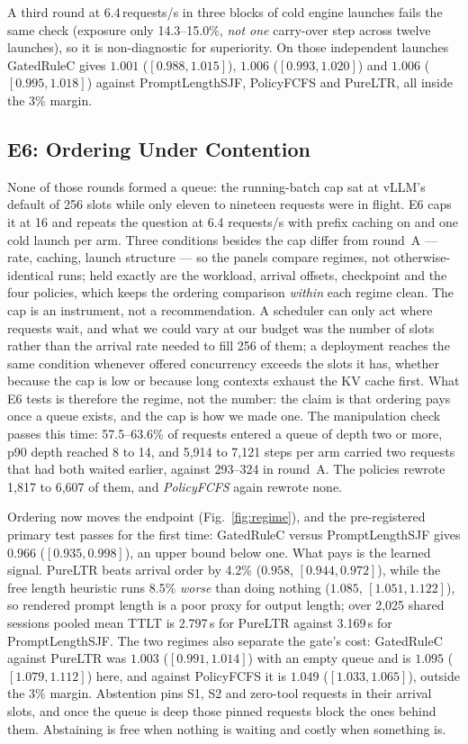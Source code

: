 A third round at 6.4\,requests/s in three blocks of cold engine launches
fails the same check (exposure only 14.3--15.0\%, \emph{not one} carry-over
step across twelve launches), so it is non-diagnostic for superiority. On
those independent launches GatedRuleC gives $1.001$ ($[0.988, 1.015]$),
$1.006$ ($[0.993, 1.020]$) and $1.006$ ($[0.995, 1.018]$) against
PromptLengthSJF, PolicyFCFS and PureLTR, all inside the 3\% margin.

\subsection{E6: Ordering Under Contention}
None of those rounds formed a queue: the running-batch cap sat at vLLM's
default of 256 slots while only eleven to nineteen requests were in flight.
E6 caps it at 16 and repeats the question at 6.4 requests/s with prefix
caching on and one cold launch per arm. Three conditions besides the cap
differ from round~A --- rate, caching, launch structure --- so the panels
compare regimes, not otherwise-identical runs; held exactly are the
workload, arrival offsets, checkpoint and the four policies, which keeps the
ordering comparison \emph{within} each regime clean. The cap
is an instrument, not a recommendation. A scheduler can only act where
requests wait, and what we could vary at our budget was the number of slots
rather than the arrival rate needed to fill 256 of them; a deployment
reaches the same condition whenever offered concurrency exceeds the slots
it has, whether because the cap is low or because long contexts exhaust the
KV cache first. What E6 tests is therefore the regime, not the number: the
claim is that ordering pays once a queue exists, and the cap is how we made
one. The
manipulation check passes this time: 57.5--63.6\% of requests entered a
queue of depth two or more, p90 depth reached 8 to 14, and 5{,}914 to
7{,}121 steps per arm carried two requests that had both waited earlier,
against 293--324 in round~A. The policies rewrote 1{,}817 to 6{,}607 of
them, and \emph{PolicyFCFS} again rewrote none.

Ordering now moves the endpoint (Fig.~\ref{fig:regime}), and the
pre-registered primary test passes for the first time: GatedRuleC versus PromptLengthSJF gives $0.966$
($[0.935, 0.998]$), an upper bound below one. What pays is the learned
signal. PureLTR beats arrival order by 4.2\% ($0.958$, $[0.944, 0.972]$),
while the free length heuristic runs 8.5\% \emph{worse} than doing nothing
($1.085$, $[1.051, 1.122]$), so rendered prompt length is a poor proxy for
output length; over 2{,}025 shared sessions pooled mean TTLT is 2.797\,s for
PureLTR against 3.169\,s for PromptLengthSJF. The two regimes also separate
the gate's cost:
GatedRuleC against PureLTR was $1.003$ ($[0.991, 1.014]$) with an empty
queue and is $1.095$ ($[1.079, 1.112]$) here, and against PolicyFCFS it is
$1.049$ ($[1.033, 1.065]$), outside the 3\% margin. Abstention pins S1, S2
and zero-tool requests in their arrival slots, and once the queue is deep
those pinned requests block the ones behind them. Abstaining is free when
nothing is waiting and costly when something is.

